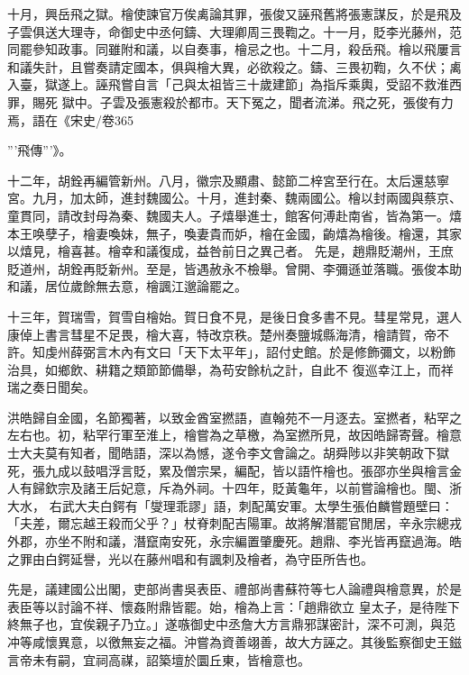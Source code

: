 \begin{pinyinscope}
 十月，興岳飛之獄。檜使諫官万俟禼論其罪，張俊又誣飛舊將張憲謀反，於是飛及子雲俱送大理寺，命御史中丞何鑄、大理卿周三畏鞫之。十一月，貶李光藤州，范同罷參知政事。同雖附和議，以自奏事，檜忌之也。十二月，殺岳飛。檜以飛屢言和議失計，且嘗奏請定國本，俱與檜大異，必欲殺之。鑄、三畏初鞫，久不伏；禼入臺，獄遂上。誣飛嘗自言「己與太祖皆三十歲建節」為指斥乘輿，受詔不救淮西罪，賜死
 獄中。子雲及張憲殺於都市。天下冤之，聞者流涕。飛之死，張俊有力焉，語在《宋史/卷365
 
 '''飛傳'''》。



 十二年，胡銓再編管新州。八月，徽宗及顯肅、懿節二梓宮至行在。太后還慈寧宮。九月，加太師，進封魏國公。十月，進封秦、魏兩國公。檜以封兩國與蔡京、童貫同，請改封母為秦、魏國夫人。子熺舉進士，館客何溥赴南省，皆為第一。熺本王唤孽子，檜妻喚妹，無子，喚妻貴而妒，檜在金國，齣熺為檜後。檜還，其家以熺見，檜喜甚。檜幸和議復成，益咎前日之異己者。
 先是，趙鼎貶潮州，王庶貶道州，胡銓再貶新州。至是，皆遇赦永不檢舉。曾開、李彌遜並落職。張俊本助和議，居位歲餘無去意，檜諷江邈論罷之。



 十三年，賀瑞雪，賀雪自檜始。賀日食不見，是後日食多書不見。彗星常見，選人康倬上書言彗星不足畏，檜大喜，特改京秩。楚州奏鹽城縣海清，檜請賀，帝不許。知虔州薛弼言木內有文曰「天下太平年」，詔付史館。於是修飾彌文，以粉飾治具，如鄉飲、耕籍之類節節備舉，為苟安餘杭之計，自此不
 復巡幸江上，而祥瑞之奏日聞矣。



 洪皓歸自金國，名節獨著，以致金酋室撚語，直翰苑不一月逐去。室撚者，粘罕之左右也。初，粘罕行軍至淮上，檜嘗為之草檄，為室撚所見，故因皓歸寄聲。檜意士大夫莫有知者，聞皓語，深以為憾，遂令李文會論之。胡舜陟以非笑朝政下獄死，張九成以鼓唱浮言貶，累及僧宗杲，編配，皆以語忤檜也。張邵亦坐與檜言金人有歸欽宗及諸王后妃意，斥為外祠。十四年，貶黃龜年，以前嘗論檜也。閩、浙大水，
 右武大夫白鍔有「燮理乖謬」語，刺配萬安軍。太學生張伯麟嘗題壁曰：「夫差，爾忘越王殺而父乎？」杖脊刺配吉陽軍。故將解潛罷官閒居，辛永宗總戎外郡，亦坐不附和議，潛竄南安死，永宗編置肇慶死。趙鼎、李光皆再竄過海。皓之罪由白鍔延譽，光以在藤州唱和有諷刺及檜者，為守臣所告也。



 先是，議建國公出閣，吏部尚書吳表臣、禮部尚書蘇符等七人論禮與檜意異，於是表臣等以討論不祥、懷姦附鼎皆罷。始，檜為上言：「趙鼎欲立
 皇太子，是待陛下終無子也，宜俟親子乃立。」遂嗾御史中丞詹大方言鼎邪謀密計，深不可測，與范冲等咸懷異意，以徼無妄之福。沖嘗為資善翊善，故大方誣之。其後監察御史王鎡言帝未有嗣，宜祠高禖，詔築壇於圜丘東，皆檜意也。




\end{pinyinscope}
